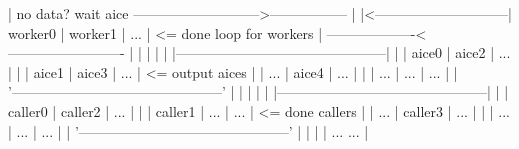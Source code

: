 \begin{DoxyPre}
                            |     no data? wait aice        --------------------------->-----------------                                 |
                            |<-----------------------------|    worker0   |   worker1    |    ...        | <= done loop for workers       |
                                                            -------------------<-------------------------                                 |
                                                                  |             |              |                                          |
                                                           |---------------------------------------------|                                |
                                                           |    aice0    |    aice2     |     ...        |                                |
                                                           |    aice1    |    aice3     |     ...        | <= output aices                |
                                                           |     ...     |    aice4     |     ...        |                                |
                                                           |     ...     |     ...      |     ...        |                                |
                                                           '---------------------------------------------'                                |
                                                                  |              |              |                                         |         
                                                           |---------------------------------------------|                                |
                                                           |   caller0   |   caller2    |     ...        |                                |
                                                           |   caller1   |     ...      |     ...        | <= done callers                |
                                                           |     ...     |   caller3    |     ...        |                                |
                                                           |     ...     |     ...      |     ...        |                                |
                                                           '---------------------------------------------'                                |
                                                                  |              |                                                        | 
                                                                 ...            ...                                                       |

\end{DoxyPre}
